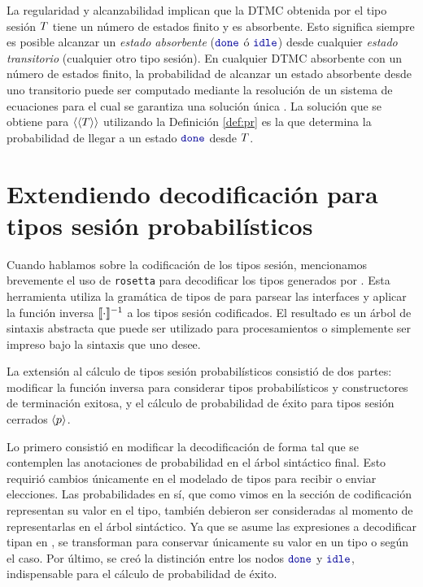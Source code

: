 La regularidad y alcanzabilidad implican que la DTMC obtenida por el tipo
sesión $T$ tiene un número de estados finito y es absorbente. Esto
significa siempre es posible alcanzar un \emph{estado absorbente} ($\Done$ ó
$\Idle$) desde cualquier \emph{estado transitorio} (cualquier otro tipo sesión).
En cualquier DTMC absorbente con un número de estados finito, la probabilidad
de alcanzar un estado absorbente desde uno transitorio puede ser computado
mediante la resolución de un sistema de ecuaciones para el cual se garantiza
una solución única . La solución que se obtiene para
$\langle\langle T\rangle\rangle$ utilizando la Definición \ref{def:pr} es la que determina
la probabilidad de llegar a un estado $\Done$ desde $T$.

\section{Extendiendo decodificación para tipos sesión probabilísticos}

Cuando hablamos sobre la codificación de los tipos sesión, mencionamos
brevemente el uso de \texttt{rosetta} para decodificar los tipos generados por
\OCaml. Esta herramienta utiliza la gramática de tipos de \OCaml para parsear
las interfaces y aplicar la función inversa $\llbracket\cdot\rrbracket^{-1}$ a los tipos sesión
codificados. El resultado es un árbol de sintaxis abstracta que puede ser
utilizado para procesamientos o simplemente ser impreso bajo la sintaxis que
uno desee.

La extensión al cálculo de tipos sesión probabilísticos consistió de dos
partes: modificar la función inversa para considerar tipos probabilísticos y
constructores de terminación exitosa, y el cálculo de probabilidad de éxito
para tipos sesión cerrados $\langle p \rangle$.

Lo primero consistió en modificar la decodificación de forma tal que se
contemplen las anotaciones de probabilidad en el árbol sintáctico final. Esto
requirió cambios únicamente en el modelado de tipos para recibir o enviar
elecciones. Las probabilidades en sí, que como vimos en la sección de
codificación representan su valor en el tipo, también debieron ser consideradas
al momento de representarlas en el árbol sintáctico. Ya que se asume las
expresiones a decodificar tipan en \OCaml, se transforman para conservar
únicamente su valor en un tipo  o  según el caso. Por último,
se creó la distinción entre los nodos $\Done$ y $\Idle$, indispensable para el
cálculo de probabilidad de éxito.

